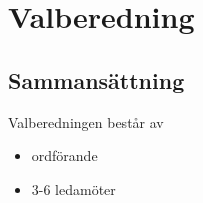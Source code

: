 \section{Valberedning}
 
\subsection{Sammansättning}
Valberedningen består av
\begin{itemize}
	\item ordförande
	\item 3-6 ledamöter
\end{itemize}
